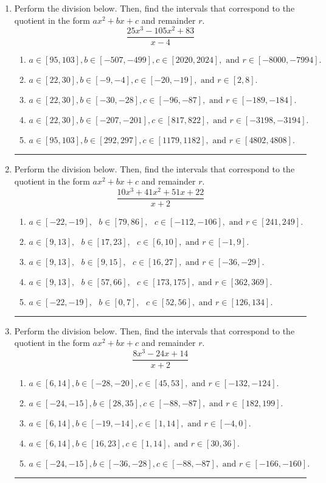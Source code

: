 \documentclass[14pt]{extbook}
\newcommand{\litem}[1]{\item#1\hspace*{-1cm}\rule{\textwidth}{0.4pt}}
\begin{document}
\begin{enumerate}
{\begin{enumerate}[label=\Alph*.]
\end{enumerate} }
\litem{
Perform the division below. Then, find the intervals that correspond to the quotient in the form $ax^2+bx+c$ and remainder $r$.\[ \frac{25x^{3} -105 x^{2} + 83}{x -4} \]\begin{enumerate}[label=\Alph*.]
\item \( a \in [95, 103], b \in [-507, -499], c \in [2020, 2024], \text{ and } r \in [-8000, -7994]. \)
\item \( a \in [22, 30], b \in [-9, -4], c \in [-20, -19], \text{ and } r \in [2, 8]. \)
\item \( a \in [22, 30], b \in [-30, -28], c \in [-96, -87], \text{ and } r \in [-189, -184]. \)
\item \( a \in [22, 30], b \in [-207, -201], c \in [817, 822], \text{ and } r \in [-3198, -3194]. \)
\item \( a \in [95, 103], b \in [292, 297], c \in [1179, 1182], \text{ and } r \in [4802, 4808]. \)

\end{enumerate} }
\litem{
Perform the division below. Then, find the intervals that correspond to the quotient in the form $ax^2+bx+c$ and remainder $r$.\[ \frac{10x^{3} +41 x^{2} +51 x + 22}{x + 2} \]\begin{enumerate}[label=\Alph*.]
\item \( a \in [-22, -19], \text{   } b \in [79, 86], \text{   } c \in [-112, -106], \text{   and   } r \in [241, 249]. \)
\item \( a \in [9, 13], \text{   } b \in [17, 23], \text{   } c \in [6, 10], \text{   and   } r \in [-1, 9]. \)
\item \( a \in [9, 13], \text{   } b \in [9, 15], \text{   } c \in [16, 27], \text{   and   } r \in [-36, -29]. \)
\item \( a \in [9, 13], \text{   } b \in [57, 66], \text{   } c \in [173, 175], \text{   and   } r \in [362, 369]. \)
\item \( a \in [-22, -19], \text{   } b \in [0, 7], \text{   } c \in [52, 56], \text{   and   } r \in [126, 134]. \)

\end{enumerate} }
\litem{
Perform the division below. Then, find the intervals that correspond to the quotient in the form $ax^2+bx+c$ and remainder $r$.\[ \frac{8x^{3} -24 x + 14}{x + 2} \]\begin{enumerate}[label=\Alph*.]
\item \( a \in [6, 14], b \in [-28, -20], c \in [45, 53], \text{ and } r \in [-132, -124]. \)
\item \( a \in [-24, -15], b \in [28, 35], c \in [-88, -87], \text{ and } r \in [182, 199]. \)
\item \( a \in [6, 14], b \in [-19, -14], c \in [1, 14], \text{ and } r \in [-4, 0]. \)
\item \( a \in [6, 14], b \in [16, 23], c \in [1, 14], \text{ and } r \in [30, 36]. \)
\item \( a \in [-24, -15], b \in [-36, -28], c \in [-88, -87], \text{ and } r \in [-166, -160]. \)


\end{enumerate}}
\end{enumerate}
\end{document}
